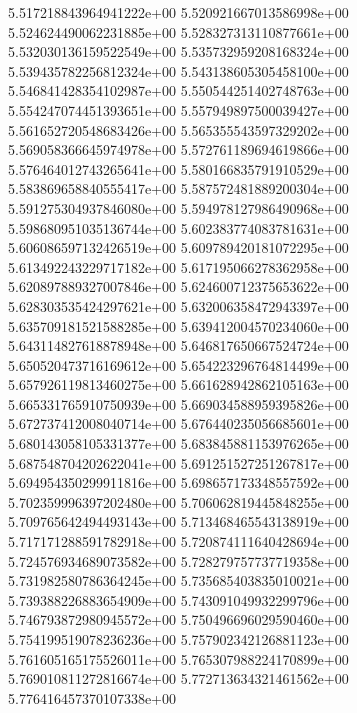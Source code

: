 5.517218843964941222e+00	5.520921667013586998e+00	5.524624490062231885e+00	5.528327313110877661e+00	5.532030136159522549e+00	5.535732959208168324e+00	5.539435782256812324e+00	5.543138605305458100e+00	5.546841428354102987e+00	5.550544251402748763e+00	5.554247074451393651e+00	5.557949897500039427e+00	5.561652720548683426e+00	5.565355543597329202e+00	5.569058366645974978e+00	5.572761189694619866e+00	5.576464012743265641e+00	5.580166835791910529e+00	5.583869658840555417e+00	5.587572481889200304e+00	5.591275304937846080e+00	5.594978127986490968e+00	5.598680951035136744e+00	5.602383774083781631e+00	5.606086597132426519e+00	5.609789420181072295e+00	5.613492243229717182e+00	5.617195066278362958e+00	5.620897889327007846e+00	5.624600712375653622e+00	5.628303535424297621e+00	5.632006358472943397e+00	5.635709181521588285e+00	5.639412004570234060e+00	5.643114827618878948e+00	5.646817650667524724e+00	5.650520473716169612e+00	5.654223296764814499e+00	5.657926119813460275e+00	5.661628942862105163e+00	5.665331765910750939e+00	5.669034588959395826e+00	5.672737412008040714e+00	5.676440235056685601e+00	5.680143058105331377e+00	5.683845881153976265e+00	5.687548704202622041e+00	5.691251527251267817e+00	5.694954350299911816e+00	5.698657173348557592e+00	5.702359996397202480e+00	5.706062819445848255e+00	5.709765642494493143e+00	5.713468465543138919e+00	5.717171288591782918e+00	5.720874111640428694e+00	5.724576934689073582e+00	5.728279757737719358e+00	5.731982580786364245e+00	5.735685403835010021e+00	5.739388226883654909e+00	5.743091049932299796e+00	5.746793872980945572e+00	5.750496696029590460e+00	5.754199519078236236e+00	5.757902342126881123e+00	5.761605165175526011e+00	5.765307988224170899e+00	5.769010811272816674e+00	5.772713634321461562e+00	5.776416457370107338e+00

